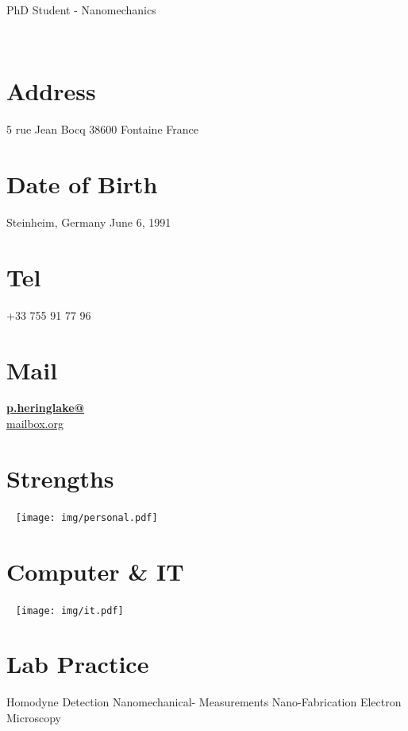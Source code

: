 \documentclass[10pt, print]{friggeri-cv}
\begin{document}
      {PhD Student - Nanomechanics}


\begin{aside}
~
~
~
  \section{Address}
    5 rue Jean Bocq
    38600 Fontaine
    France
    ~
  \section{Date of Birth}
    Steinheim, Germany
    June 6, 1991
    ~ \section{Tel}
    +33 755 91 77 96
    ~
  \section{Mail}
    \href{mailto:p.heringlake@mailbox.org}{\textbf{p.heringlake@}\\mailbox.org}
  \section{Strengths}
  ~
  \texttt{[image: img/personal.pdf]}
  \section{Computer \& IT}
  ~
    \texttt{[image: img/it.pdf]}
  \section{Lab Practice}
  \small{Homodyne Detection}
  \small{Nanomechanical- Measurements}
\small{Nano-Fabrication}
\small{Electron Microscopy}
    ~
\end{aside}
\end{document}
